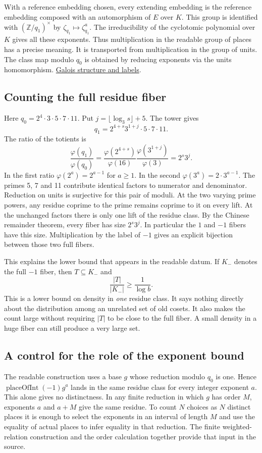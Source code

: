 \documentclass[12pt,letterpaper]{article}
\newcommand{\readable}[3]{\href{https://github.com/leanprover-community/riemann-hypothesis/blob/e063a923620ee7787b4a1270421478645bf66bdb/src/#1\#L#2}{#3}}
\begin{document}
With a reference embedding chosen, every extending embedding is the reference embedding composed with an automorphism of $E$ over $K$. This group is identified with $(\mathbb Z/q_1)^\times$ by $\zeta_{q_1}\mapsto\zeta_{q_1}^{a}$. The irreducibility of the cyclotomic polynomial over $K$ gives all these exponents. Thus multiplication in the readable group of places has a precise meaning. It is transported from multiplication in the group of units. The class map modulo $q_0$ is obtained by reducing exponents via the units homomorphism. \readable{New/Reduction/Data/FieldsAndPlaces.lean}{236}{Galois structure and labels}.

\subsection{Counting the full residue fiber}
Here $q_0=2^4\cdot3\cdot5\cdot7\cdot11$. Put $j=\lfloor\log_3 s\rfloor+5$. The tower gives
\[
 q_1=2^{4+s}3^{1+j}\cdot5\cdot7\cdot11.
\]
The ratio of the totients is
\[
 \frac{\varphi(q_1)}{\varphi(q_0)}
  =\frac{\varphi(2^{4+s})}{\varphi(16)}
    \frac{\varphi(3^{1+j})}{\varphi(3)}
  =2^s3^j.
\]
In the first ratio $\varphi(2^a)=2^{a-1}$ for $a\ge1$. In the second $\varphi(3^a)=2\cdot3^{a-1}$. The primes 5, 7 and 11 contribute identical factors to numerator and denominator. Reduction on units is surjective for this pair of moduli. At the two varying prime powers, any residue coprime to the prime remains coprime to it on every lift. At the unchanged factors there is only one lift of the residue class. By the Chinese remainder theorem, every fiber has size $2^s3^j$. In particular the $1$ and $-1$ fibers have this size. Multiplication by the label of $-1$ gives an explicit bijection between those two full fibers.

This explains the lower bound that appears in the readable datum. If $K_-$ denotes the full $-1$ fiber, then $T\subseteq K_-$ and
\[
                  \frac{|T|}{|K_-|}\ge\frac1{\log b}.
\]
This is a lower bound on density in \emph{one} residue class. It says nothing directly about the distribution among an unrelated set of old cosets. It also makes the count large without requiring $|T|$ to be close to the full fiber. A small density in a huge fiber can still produce a very large set.

\subsection{A control for the role of the exponent bound}
The readable construction uses a base $g$ whose reduction modulo $q_0$ is one. Hence $\operatorname{placeOfInt}(-1)g^a$ lands in the same residue class for every integer exponent $a$. This alone gives no distinctness. In any finite reduction in which $g$ has order $M$, exponents $a$ and $a+M$ give the same residue. To count $N$ choices as $N$ distinct places it is enough to select the exponents in an interval of length $M$ and use the equality of actual places to infer equality in that reduction. The finite weighted-relation construction and the order calculation together provide that input in the source.
\end{document}
